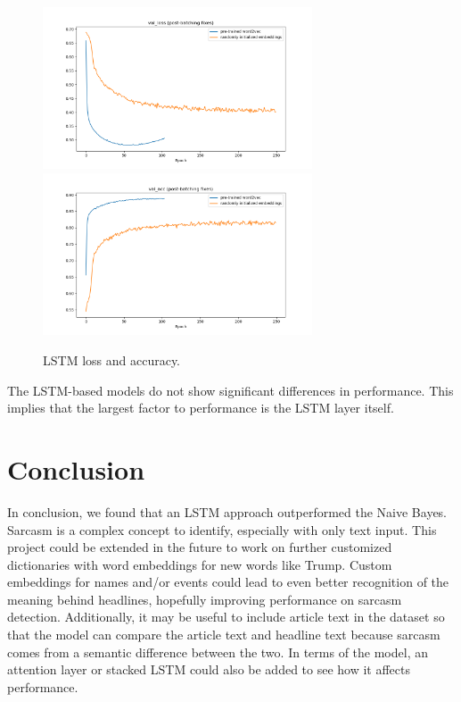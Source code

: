\documentclass[11pt]{article}
\begin{document}
\begin{figure}[tbh]
    \centering
    \includegraphics[width=8cm]{val_loss.png}
    \includegraphics[width=8cm]{val_acc.png}
    \caption{LSTM loss and accuracy.}
    \label{fig:cm}
\end{figure}



The LSTM-based models do not show significant differences in performance.
This implies that the largest factor to performance is the LSTM layer itself.

\section{Conclusion}

In conclusion, we found that an LSTM approach outperformed the Naive Bayes.
Sarcasm is a complex concept to identify, especially with only text input. This
project could be extended in the future to work on further customized
dictionaries with word embeddings for new words like Trump. Custom embeddings
for names and/or events could lead to even better recognition of the meaning
behind headlines, hopefully improving performance on sarcasm detection.
Additionally, it may be useful to include article text in the dataset so that
the model can compare the article text and headline text because sarcasm comes
from a semantic difference between the two. In terms of the model, an attention
layer or stacked LSTM could also be added to see how it affects performance.
\end{document}
